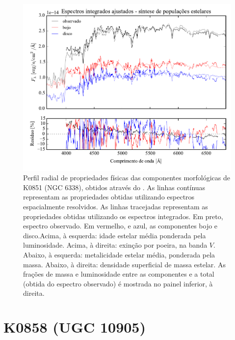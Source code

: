 \begin{figure}
	\includegraphics[page=14]{figuras/sample006a_synthesis}
	\caption[Propriedades físicas das componentes morfológicas de K0851 (NGC 6338)]
	{Perfil radial de propriedades físicas das componentes morfológicas de
	K0851 (NGC 6338), obtidos através do \starlight. As linhas contínuas
	representam as propriedades obtidas utilizando espectros espacialmente
	resolvidos. As linhas tracejadas representam as propriedades obtidas utilizando
	os espectros integrados. Em preto, espectro observado. Em vermelho, e azul, as
	componentes bojo e disco.Acima, à esquerda: idade estelar média ponderada pela
	luminosidade. Acima, à direita: exinção por poeira, na banda $V$. Abaixo, à
	esquerda: metalicidade estelar média, ponderada pela massa. Abaixo, à direita:
	densidade superficial de massa estelar. As frações de massa e luminosidade
	entre as componentes e a total (obtida do espectro observado) é mostrada no
	painel inferior, à direita.}
	\label{fig:decompSinteseRadprof:K0851}
\end{figure}


\section{K0858 (UGC 10905)}
\label{apendice:Decomp:K00858}


